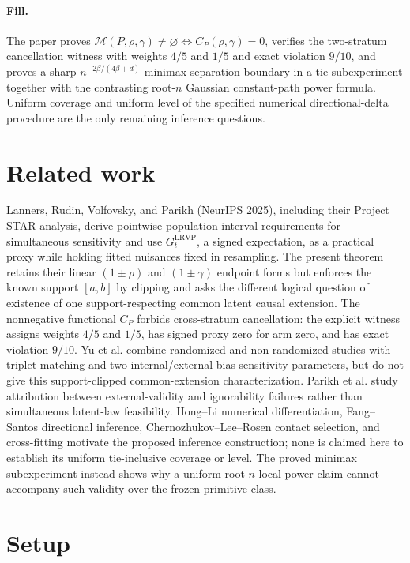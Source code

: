 \documentclass{article}
\begin{document}
\paragraph{Fill.} The paper proves \(\mathcal M(P,\rho,\gamma)\ne\varnothing\Longleftrightarrow C_P(\rho,\gamma)=0\), verifies the two-stratum cancellation witness with weights \(4/5\) and \(1/5\) and exact violation \(9/10\), and proves a sharp \(n^{-2\beta/(4\beta+d)}\) minimax separation boundary in a tie subexperiment together with the contrasting root-\(n\) Gaussian constant-path power formula. Uniform coverage and uniform level of the specified numerical directional-delta procedure are the only remaining inference questions.

\section{Related work}

Lanners, Rudin, Volfovsky, and Parikh (NeurIPS 2025), including their Project STAR analysis, derive pointwise population interval requirements for simultaneous sensitivity and use \(G_t^{\mathrm{LRVP}}\), a signed expectation, as a practical proxy while holding fitted nuisances fixed in resampling. The present theorem retains their linear \((1\pm\rho)\) and \((1\pm\gamma)\) endpoint forms but enforces the known support \([a,b]\) by clipping and asks the different logical question of existence of one support-respecting common latent causal extension. The nonnegative functional \(C_P\) forbids cross-stratum cancellation: the explicit witness assigns weights \(4/5\) and \(1/5\), has signed proxy zero for arm zero, and has exact violation \(9/10\). Yu et al. combine randomized and non-randomized studies with triplet matching and two internal/external-bias sensitivity parameters, but do not give this support-clipped common-extension characterization. Parikh et al. study attribution between external-validity and ignorability failures rather than simultaneous latent-law feasibility. Hong--Li numerical differentiation, Fang--Santos directional inference, Chernozhukov--Lee--Rosen contact selection, and cross-fitting motivate the proposed inference construction; none is claimed here to establish its uniform tie-inclusive coverage or level. The proved minimax subexperiment instead shows why a uniform root-\(n\) local-power claim cannot accompany such validity over the frozen primitive class.

\section{Setup}
\end{document}
